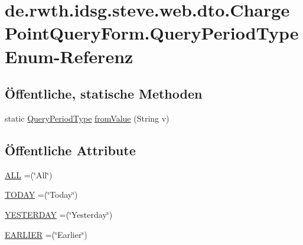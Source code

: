 \hypertarget{enumde_1_1rwth_1_1idsg_1_1steve_1_1web_1_1dto_1_1_charge_point_query_form_1_1_query_period_type}{\section{de.\-rwth.\-idsg.\-steve.\-web.\-dto.\-Charge\-Point\-Query\-Form.\-Query\-Period\-Type Enum-\/\-Referenz}
\label{enumde_1_1rwth_1_1idsg_1_1steve_1_1web_1_1dto_1_1_charge_point_query_form_1_1_query_period_type}
}
\subsection*{Öffentliche, statische Methoden}
\begin{DoxyCompactItemize}
\item 
static \hyperlink{enumde_1_1rwth_1_1idsg_1_1steve_1_1web_1_1dto_1_1_charge_point_query_form_1_1_query_period_type}{Query\-Period\-Type} \hyperlink{enumde_1_1rwth_1_1idsg_1_1steve_1_1web_1_1dto_1_1_charge_point_query_form_1_1_query_period_type_a85aadacf9fe2748ea30092d06783b445}{from\-Value} (String v)
\end{DoxyCompactItemize}
\subsection*{Öffentliche Attribute}
\begin{DoxyCompactItemize}
\item 
\hyperlink{enumde_1_1rwth_1_1idsg_1_1steve_1_1web_1_1dto_1_1_charge_point_query_form_1_1_query_period_type_ac4ce8b2768cf8d53ffcfd11afc76197f}{A\-L\-L} =(\char`\"{}All\char`\"{})
\item 
\hyperlink{enumde_1_1rwth_1_1idsg_1_1steve_1_1web_1_1dto_1_1_charge_point_query_form_1_1_query_period_type_a2760cbd2f0d43ab21fa631d97e361e02}{T\-O\-D\-A\-Y} =(\char`\"{}Today\char`\"{})
\item 
\hyperlink{enumde_1_1rwth_1_1idsg_1_1steve_1_1web_1_1dto_1_1_charge_point_query_form_1_1_query_period_type_a40d99e045a7706e89b7ccf007d45c12f}{Y\-E\-S\-T\-E\-R\-D\-A\-Y} =(\char`\"{}Yesterday\char`\"{})
\item 
\hyperlink{enumde_1_1rwth_1_1idsg_1_1steve_1_1web_1_1dto_1_1_charge_point_query_form_1_1_query_period_type_a03600283ef1d7db7a143696262f6e937}{E\-A\-R\-L\-I\-E\-R} =(\char`\"{}Earlier\char`\"{})
\end{DoxyCompactItemize}


